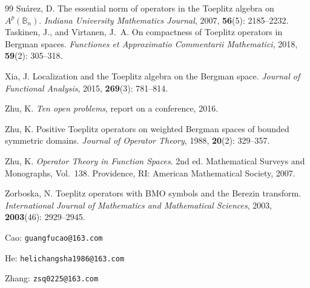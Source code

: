 \documentclass[12pt,a4paper]{article}
\theoremstyle{remark}
\begin{document}
\begin{thebibliography}{99}
Su\'arez, D.
The essential norm of operators in the Toeplitz algebra on $A^p(\mathbb B_n)$.
\emph{Indiana University Mathematics Journal},
2007, \textbf{56}(5): 2185--2232.
Taskinen, J., and Virtanen, J.~A.
On compactness of Toeplitz operators in Bergman spaces.
\emph{Functiones et Approximatio Commentarii Mathematici},
2018, \textbf{59}(2): 305--318.

Xia, J.
Localization and the Toeplitz algebra on the Bergman space.
\emph{Journal of Functional Analysis},
2015, \textbf{269}(3): 781--814.

Zhu, K.
\emph{Ten open problems},
report on a conference, 2016.

Zhu, K.
Positive Toeplitz operators on weighted Bergman spaces of bounded symmetric domains.
\emph{Journal of Operator Theory},
1988, \textbf{20}(2): 329--357.

Zhu, K.
\emph{Operator Theory in Function Spaces}. 2nd ed.
Mathematical Surveys and Monographs, Vol.~138.
Providence, RI: American Mathematical Society, 2007.

Zorboska, N.
Toeplitz operators with BMO symbols and the Berezin transform.
\emph{International Journal of Mathematics and Mathematical Sciences},
2003, \textbf{2003}(46): 2929--2945.


\end{thebibliography}



Cao: \texttt{guangfucao@163.com}


He: \texttt{helichangsha1986@163.com}


Zhang: \texttt{zsq0225@163.com}
\end{document}
